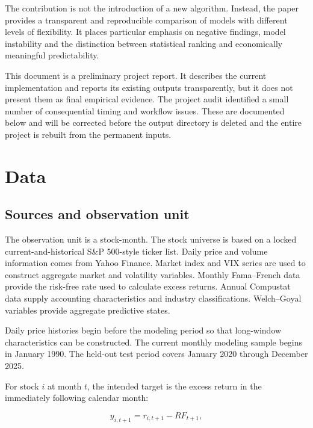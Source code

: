 \documentclass[11pt,a4paper]{article}
\begin{document}
The contribution is not the introduction of a new algorithm. Instead, the
paper provides a transparent and reproducible comparison of models with
different levels of flexibility. It places particular emphasis on negative
findings, model instability and the distinction between statistical ranking
and economically meaningful predictability.

This document is a preliminary project report. It describes the current
implementation and reports its existing outputs transparently, but it does not
present them as final empirical evidence. The project audit identified a small
number of consequential timing and workflow issues. These are documented below
and will be corrected before the output directory is deleted and the entire
project is rebuilt from the permanent inputs.


\section{Data}
\label{sec:data}

\subsection{Sources and observation unit}

The observation unit is a stock-month. The stock universe is based on a locked
current-and-historical S\&P 500-style ticker list. Daily price and volume
information comes from Yahoo Finance. Market index and VIX series are used to
construct aggregate market and volatility variables. Monthly Fama--French data
provide the risk-free rate used to calculate excess returns. Annual Compustat
data supply accounting characteristics and industry classifications.
Welch--Goyal variables provide aggregate predictive states.

Daily price histories begin before the modeling period so that long-window
characteristics can be constructed. The current monthly modeling sample begins in
January 1990. The held-out test period covers January 2020 through December
2025.

For stock \(i\) at month \(t\), the intended target is the excess return in the
immediately following calendar month:

\begin{equation}
 y_{i,t+1}
 =
 r_{i,t+1}-RF_{t+1},
 \label{eq:target}
\end{equation}
\end{document}
